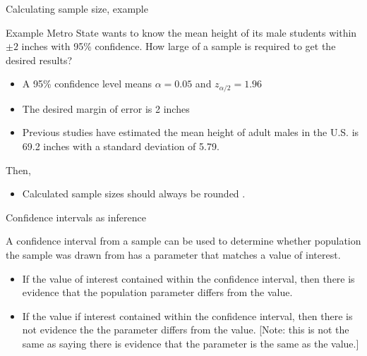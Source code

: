 \documentclass[xcolor=table, aspectratio=169, bigger]{beamer}
\begin{document}
\begin{frame}{Calculating sample size, example}
\begin{exampleblock}{Example}
Metro State wants to know the mean height of its male students within $\pm 2$ inches with 95\% confidence. How large of a sample is required to get the desired results? \\ \smallskip

\begin{itemize}
\pause\item A 95\% confidence level means $\alpha = 0.05$ and $z_{\alpha/2} = 1.96$

\pause\item The desired margin of error is 2 inches

\pause\item Previous studies have estimated the mean height of adult males in the U.S. is 69.2 inches with a standard deviation of 5.79.
\end{itemize}

\pause Then, \\ \smallskip
{} \smallskip

\begin{itemize}
\pause\item Calculated sample sizes should always be rounded .
\end{itemize}
\end{exampleblock}
\end{frame}

\begin{frame}{Confidence intervals as inference}
\begin{block}{}
A confidence interval from a sample can be used to determine whether population the sample was drawn from has a parameter that  matches a value of interest.
\begin{itemize}
\pause\item If the value of interest  contained within the confidence interval, then there is evidence that the population parameter differs from the value.

\pause\item If the value if interest  contained within the confidence interval, then there is not evidence the the parameter differs from the value. [Note: this is not the same as saying there is evidence that the parameter is the same as the value.]
\end{itemize} 
\end{block}
\end{frame}
\end{document}
